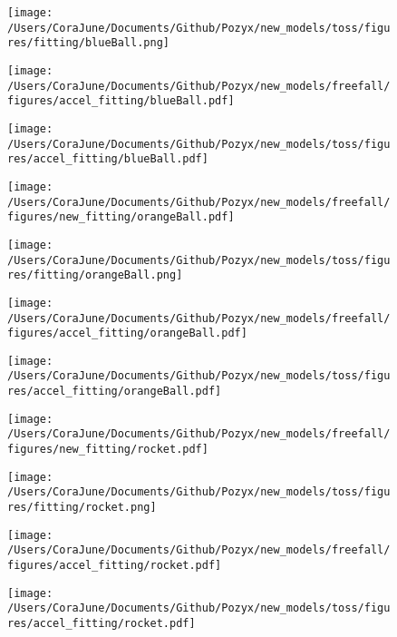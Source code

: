 \documentclass[14pt]{article}
\begin{document}
\begin{centering}
\begin{figure}
\begin{multicols}{2}
    \texttt{[image: /Users/CoraJune/Documents/Github/Pozyx/new\_models/toss/figures/fitting/blueBall.png]}
\end{multicols}

\begin{multicols}{2}
    \texttt{[image: /Users/CoraJune/Documents/Github/Pozyx/new\_models/freefall/figures/accel\_fitting/blueBall.pdf]}

    \texttt{[image: /Users/CoraJune/Documents/Github/Pozyx/new\_models/toss/figures/accel\_fitting/blueBall.pdf]}
\end{multicols}

\end{figure}

\begin{figure}
\begin{multicols}{2}
    \texttt{[image: /Users/CoraJune/Documents/Github/Pozyx/new\_models/freefall/figures/new\_fitting/orangeBall.pdf]}

    \texttt{[image: /Users/CoraJune/Documents/Github/Pozyx/new\_models/toss/figures/fitting/orangeBall.png]}
\end{multicols}

\begin{multicols}{2}
    \texttt{[image: /Users/CoraJune/Documents/Github/Pozyx/new\_models/freefall/figures/accel\_fitting/orangeBall.pdf]}

    \texttt{[image: /Users/CoraJune/Documents/Github/Pozyx/new\_models/toss/figures/accel\_fitting/orangeBall.pdf]}
\end{multicols}

\end{figure}

\begin{figure}
\begin{multicols}{2}
    \texttt{[image: /Users/CoraJune/Documents/Github/Pozyx/new\_models/freefall/figures/new\_fitting/rocket.pdf]}

    \texttt{[image: /Users/CoraJune/Documents/Github/Pozyx/new\_models/toss/figures/fitting/rocket.png]}
\end{multicols}

\begin{multicols}{2}
    \texttt{[image: /Users/CoraJune/Documents/Github/Pozyx/new\_models/freefall/figures/accel\_fitting/rocket.pdf]}

    \texttt{[image: /Users/CoraJune/Documents/Github/Pozyx/new\_models/toss/figures/accel\_fitting/rocket.pdf]}
\end{multicols}

\end{figure}

\end{centering}
\end{document}
